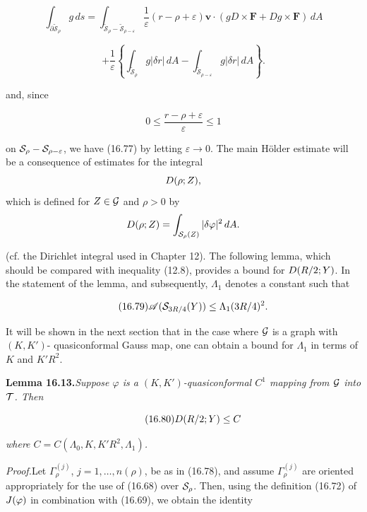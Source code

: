 \[
\int_{\partial \widetilde{\mathscr{S}}_{\rho}} g\,ds
= \int_{\widetilde{\mathscr{S}}_{\rho}-\widetilde{\mathscr{S}}_{\rho-\varepsilon}}
\frac{1}{\varepsilon}(r-\rho+\varepsilon)\mathbf{v}\cdot(gD\times \mathbf{F}+Dg\times \mathbf{F})\,dA
\]

\[
+ \frac{1}{\varepsilon}\left\{\int_{\widetilde{\mathscr{S}}_{\rho}} g|\delta r|\,dA
- \int_{\widetilde{\mathscr{S}}_{\rho-\varepsilon}} g|\delta r|\,dA\right\}.
\]



and, since

\[
0 \le \frac{r-\rho+\varepsilon}{\varepsilon} \le 1
\]

on $\mathcal{S}_{\rho}-\mathcal{S}_{\rho-\varepsilon}$, we have (16.77) by letting $\varepsilon \to 0$.
The main H\"older estimate will be a consequence of estimates for the integral
\[
D(\rho; Z),
\]
which is defined for $Z \in \mathcal{G}$ and $\rho > 0$ by
\[
D(\rho; Z)=\int_{\mathcal{S}_{\rho}(Z)} |\delta \varphi|^2\, dA.
\]

(cf. the Dirichlet integral used in Chapter 12).
The following lemma, which should be compared with inequality (12.8),
provides a bound for $D(R/2; Y)$. In the statement of the lemma, and subsequently,
$\Lambda_1$ denotes a constant such that

\begin{equation}\tag{16.79}
\mathscr{A}(\mathcal{S}_{3R/4}(Y)) \le \Lambda_1 (3R/4)^2.
\end{equation}

It will be shown in the next section that in the case where $\mathcal{G}$ is a graph with $(K,K')$-
quasiconformal Gauss map, one can obtain a bound for $\Lambda_1$ in terms of $K$ and $K'R^2$.

\medskip

\noindent\textbf{Lemma 16.13.}\quad \textit{Suppose $\varphi$ is a $(K,K')$-quasiconformal $C^1$ mapping from $\mathcal{G}$ into $\mathcal{T}$.
Then}

\begin{equation}\tag{16.80}
D(R/2; Y) \le C
\end{equation}

\noindent\textit{where $C = C(\Lambda_0, K, K'R^2, \Lambda_1)$.}

\medskip

\noindent\textit{Proof.}\quad Let $\Gamma_{\rho}^{(j)}$, $j=1,\ldots,n(\rho)$, be as in (16.78), and assume $\Gamma_{\rho}^{(j)}$ are oriented
appropriately for the use of (16.68) over $\mathcal{S}_{\rho}$. Then, using the definition (16.72) of
$J(\varphi)$ in combination with (16.69), we obtain the identity

